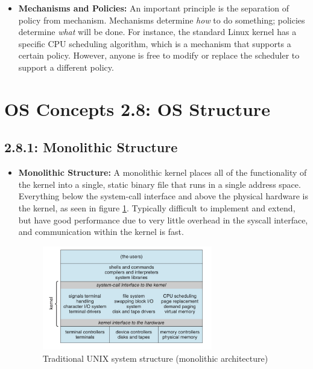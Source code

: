 \documentclass[12pt]{article}
\begin{document}
\begin{itemize}
    \item \textbf{Mechanisms and Policies:} An important principle is the separation of policy from mechanism. Mechanisms determine \textit{how} to do something; policies determine \textit{what} will be done. For instance, the standard Linux kernel has a specific CPU scheduling algorithm, which is a mechanism that supports a certain policy. However, anyone is free to modify or replace the scheduler to support a different policy.
\end{itemize}

\section*{OS Concepts 2.8: OS Structure}

\subsection*{2.8.1: Monolithic Structure}

\begin{itemize}
    \item \textbf{Monolithic Structure:} A monolithic kernel places all of the functionality of the kernel into a single, static binary file that runs in a single address space. Everything below the system-call interface and above the physical hardware is the kernel, as seen in figure \ref{fig:monolithic-structure}. Typically difficult to implement and extend, but have good performance due to very little overhead in the syscall interface, and communication within the kernel is fast.
        \begin{figure}[ht]
            \centering
            \includegraphics[width=0.7\textwidth]{figures/monolithic-structure.jpg}
            \caption{Traditional UNIX system structure (monolithic architecture)}
            \label{fig:monolithic-structure}
        \end{figure}
\end{itemize}
\end{document}
